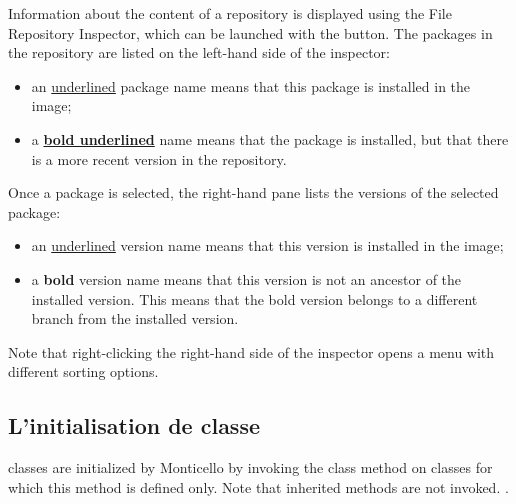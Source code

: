 \documentclass[a4paper,10pt,twoside]{book}
\begin{document}

Information about the content of a repository is displayed using the File Repository Inspector, which can be launched with the  button. The packages in the repository are listed on the left-hand side of the inspector:

\begin{itemize}
\item an \underline{underlined} package name means that this package is installed in the image;
\item a \underline{\bf bold underlined} name means that the package is installed, but that there is a more recent version in the repository.
\end{itemize}

\noindent
Once a package is selected, the right-hand pane lists the versions of the selected package:

\begin{itemize}
\item an \underline{underlined} version name means that this version is installed in the image;
\item a {\bf bold} version name means that this version is not an ancestor of the installed version. This means that the bold version belongs to a different branch from the installed version.
\end{itemize}
\noindent
Note that right-clicking the right-hand side of the inspector opens a menu with different sorting options.


\subsection{L'initialisation de classe} %

 classes are initialized by Monticello by invoking the  class method on classes for which this method is defined only. Note that inherited  methods are not invoked.
.
\end{document}
